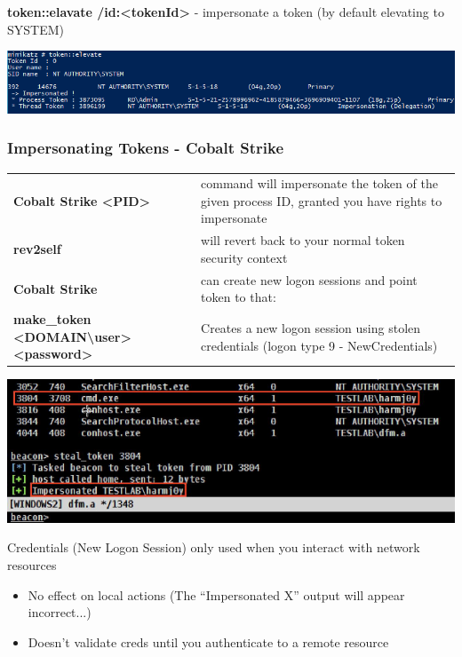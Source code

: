 \textbf{token::elavate /id:<tokenId>} - impersonate a token (by default elevating to SYSTEM)
\begin{center}
    \includegraphics[width=\textwidth]{resources/11-impersonating-tokens-2.png}
\end{center}


\subsubsection{Impersonating Tokens - Cobalt Strike}
\begin{tabularx}{\textwidth}{l l}
    \textbf{Cobalt Strike <PID>} & command will impersonate the token of the given process ID, granted you have rights to impersonate \\
    \textbf{rev2self} & will revert back to your normal token security context  \\
    \textbf{Cobalt Strike} & can create new logon sessions and point token to that: \\
    \textbf{make\_token <DOMAIN\textbackslash{}user> <password>} & Creates a new logon session using stolen credentials (logon type 9 - NewCredentials) \\
\end{tabularx}

\begin{center}
    \includegraphics[width=\textwidth]{resources/11-impersonating-token-cobalt-strike.png}
\end{center}

Credentials (New Logon Session) only used when you interact with network resources
\begin{itemize}
    \item No effect on local actions (The “Impersonated X” output will appear incorrect...)
    \item Doesn't validate creds until you authenticate to a remote resource
\end{itemize}

